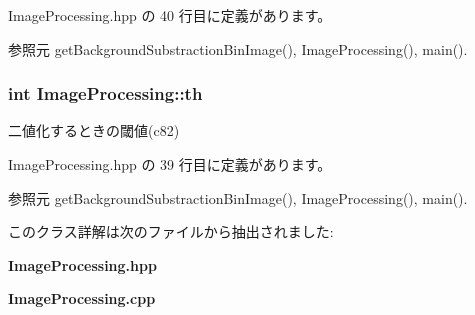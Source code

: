  Image\-Processing.\-hpp の 40 行目に定義があります。



参照元 get\-Background\-Substraction\-Bin\-Image(), Image\-Processing(), main().

\subsubsection[{th}]{\setlength{\rightskip}{0pt plus 5cm}int Image\-Processing\-::th}\label{class_image_processing_a3b07a07726eed8b5e1da00017713068d}


二値化するときの閾値(c82) 



 Image\-Processing.\-hpp の 39 行目に定義があります。



参照元 get\-Background\-Substraction\-Bin\-Image(), Image\-Processing(), main().



このクラス詳解は次のファイルから抽出されました\-:\begin{DoxyCompactItemize}
\item 
{\bf Image\-Processing.\-hpp}\item 
{\bf Image\-Processing.\-cpp}\end{DoxyCompactItemize}
